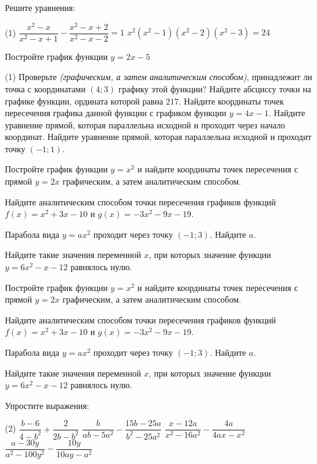 \begin{class}[number=5]
	\begin{listofex}
		\item Решите уравнения:
		\begin{tasks}(1)
			\task \( \dfrac{x^2-x}{x^2-x+1}-\dfrac{x^2-x+2}{x^2-x-2}=1 \)
			\task \( x^2(x^2-1)(x^2-2)(x^2-3)=24 \)
		\end{tasks}
		\item Постройте график функции \( y=2x-5 \)
		\begin{tasks}(1)
			\task Проверьте \textit{(графическим, а затем аналитическим способом)}, принадлежит ли точка с координатами \( (4;3) \) графику этой функции?
			\task Найдите абсциссу точки на графике функции, ордината которой равна \( 217 \).
			\task Найдите координаты точек пересечения графика данной функции с графиком функции \( y=4x-1 \).
			\task Найдите уравнение прямой, которая параллельна исходной и проходит через начало координат.
			\task Найдите уравнение прямой, которая параллельна исходной и проходит точку \( (-1;1) \).
		\end{tasks}
		\item Постройте график функции \(y=x^2\) и найдите координаты точек пересечения с прямой \( y=2x \) графическим, а затем аналитическим способом.
		\item Найдите аналитическим способом точки пересечения графиков функций \(f(x)=x^2+3x-10\)	и \( g(x)=-3x^2-9x-19 \).
		\item Парабола вида \( y=ax^2 \) проходит через точку \( (-1;3) \). Найдите \( a \).
		\item Найдите такие значения переменной \( x \), при которых значение функции \( y=6x^2-x-12 \) равнялось нулю.
	\end{listofex}
\end{class}

\begin{class}[number=6]
	\begin{listofex}
			\item Постройте график функции \(y=x^2\) и найдите координаты точек пересечения с прямой \( y=2x \) графическим, а затем аналитическим способом.
		\item Найдите аналитическим способом точки пересечения графиков функций \(f(x)=x^2+3x-10\)	и \( g(x)=-3x^2-9x-19 \).
		\item Парабола вида \( y=ax^2 \) проходит через точку \( (-1;3) \). Найдите \( a \).
		\item Найдите такие значения переменной \( x \), при которых значение функции \( y=6x^2-x-12 \) равнялось нулю.
		\item Упростите выражения:
		\begin{tasks}(2)
			\task \( \dfrac{b-6}{4-b^2}+\dfrac{2}{2b-b^2} \)
			\task \( \dfrac{b}{ab-5a^2}-\dfrac{15b-25a}{b^2-25a^2} \)
			\task \( \dfrac{x-12a}{x^2-16a^2}-\dfrac{4a}{4ax-x^2} \)
			\task \( \dfrac{a-30y}{a^2-100y^2}-\dfrac{10y}{10ay-a^2} \)
		\end{tasks}
	\end{listofex}
\end{class}

